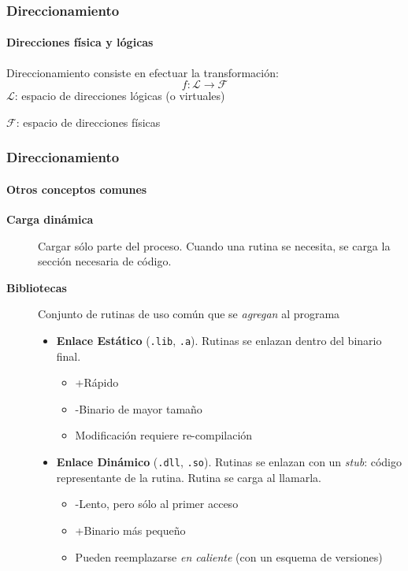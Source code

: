 \documentclass[letter]{beamer}
\begin{document}
\begin{frame}
  \frametitle{Direccionamiento}
  \framesubtitle{Direcciones física y lógicas}

  Direccionamiento consiste en efectuar la transformación:
  \[
    f: \mathcal{L} \to \mathcal{F}
  \]
  $\mathcal{L}$: espacio de direcciones lógicas (o virtuales)

  $\mathcal{F}$: espacio de direcciones físicas

  
  
\end{frame}
\begin{frame}
  \frametitle{Direccionamiento}
  \framesubtitle{Otros conceptos comunes}

  \begin{description}
    \item[{\bf Carga dinámica}] Cargar sólo parte del proceso. Cuando una rutina se necesita,
                                se carga la sección necesaria de código.
    \item[{\bf Bibliotecas}] Conjunto de rutinas de uso común que se {\em agregan} al programa
      \begin{itemize}
        \item {\bf Enlace Estático} ({\tt .lib}, {\tt .a}). Rutinas se enlazan dentro del binario final.
            \begin{itemize}
              \item +Rápido
              \item -Binario de mayor tamaño
              \item Modificación requiere re-compilación
            \end{itemize}
        \item {\bf Enlace Dinámico} ({\tt .dll}, {\tt .so}). Rutinas se enlazan con un {\em stub}: 
                              código representante de la rutina. Rutina se carga al llamarla.
            \begin{itemize}
              \item -Lento, pero sólo al primer acceso
              \item +Binario más pequeño
              \item Pueden reemplazarse {\em en caliente} (con un esquema de versiones)
            \end{itemize}
                              
      \end{itemize}
  \end{description}
  
\end{frame}
\end{document}
